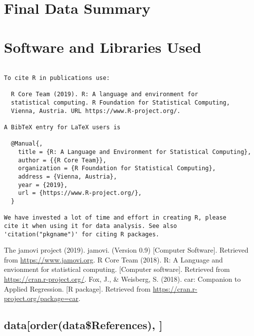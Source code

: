\documentclass[]{article}
\begin{document}
\pagebreak

\hypertarget{final-data-summary}{%
\section{Final Data Summary}\label{final-data-summary}}

\pagebreak

\hypertarget{software-and-libraries-used}{%
\section{Software and Libraries
Used}\label{software-and-libraries-used}}

\begin{verbatim}

To cite R in publications use:

  R Core Team (2019). R: A language and environment for
  statistical computing. R Foundation for Statistical Computing,
  Vienna, Austria. URL https://www.R-project.org/.

A BibTeX entry for LaTeX users is

  @Manual{,
    title = {R: A Language and Environment for Statistical Computing},
    author = {{R Core Team}},
    organization = {R Foundation for Statistical Computing},
    address = {Vienna, Austria},
    year = {2019},
    url = {https://www.R-project.org/},
  }

We have invested a lot of time and effort in creating R, please
cite it when using it for data analysis. See also
'citation("pkgname")' for citing R packages.
\end{verbatim}

The jamovi project (2019). jamovi. (Version 0.9) {[}Computer
Software{]}. Retrieved from \url{https://www.jamovi.org}. R Core Team
(2018). R: A Language and envionment for statistical computing.
{[}Computer software{]}. Retrieved from
\url{https://cran.r-project.org/}. Fox, J., \& Weisberg, S. (2018). car:
Companion to Applied Regression. {[}R package{]}. Retrieved from
\url{https://cran.r-project.org/package=car}.

\hypertarget{dataorderdatareferences}{%
\subsection{data{[}order(data\$References),
{]}}\label{dataorderdatareferences}}
\end{document}
